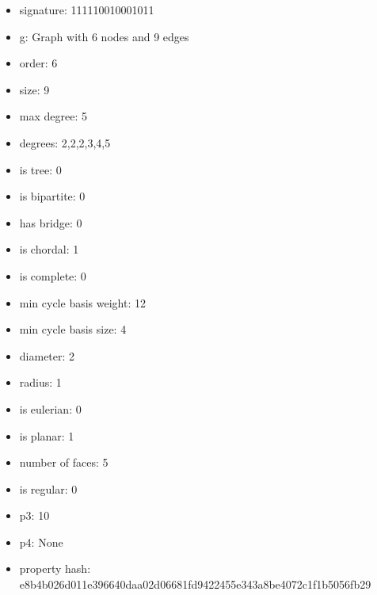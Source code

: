 \begin{itemize}
\item signature: 111110010001011
\item g: Graph with 6 nodes and 9 edges
\item order: 6
\item size: 9
\item max degree: 5
\item degrees: 2,2,2,3,4,5
\item is tree: 0
\item is bipartite: 0
\item has bridge: 0
\item is chordal: 1
\item is complete: 0
\item min cycle basis weight: 12
\item min cycle basis size: 4
\item diameter: 2
\item radius: 1
\item is eulerian: 0
\item is planar: 1
\item number of faces: 5
\item is regular: 0
\item p3: 10
\item p4: None
\item property hash: e8b4b026d011e396640daa02d06681fd9422455e343a8be4072c1f1b5056fb29
\end{itemize}
\newpage
\begin{figure}
\end{figure}
